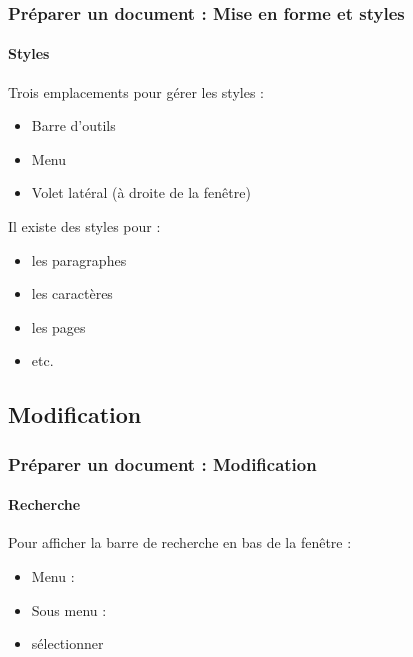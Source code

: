 \documentclass[xcolor=table]{beamer}
\begin{document}
\begin{frame}
\frametitle{Préparer un document : Mise en forme et styles}
\framesubtitle{Styles}

\begin{minipage}{0.69\textwidth}
	Trois emplacements pour gérer les styles : 
	\begin{itemize}
		\item Barre d'outils
		\item Menu  
		\item Volet latéral (à droite de la fenêtre)
	\end{itemize}

	\vspace{12pt}

	Il existe des styles pour : 
	\begin{itemize}
		\item les paragraphes
		\item les caractères 
		\item les pages
		\item etc.
	\end{itemize}
\end{minipage}
\begin{minipage}{0.30\textwidth}
	
	\vspace{6pt} 
	
\end{minipage}

\end{frame}

\subsection{Modification}%

\begin{frame}[t]
\frametitle{Préparer un document : Modification}
\framesubtitle{Recherche}

	Pour afficher la barre de recherche en bas de la fenêtre :
	\begin{itemize}
		\item Menu : 
		\item Sous menu : 
		\item sélectionner 
	\end{itemize}
%	


\end{frame}
\end{document}
